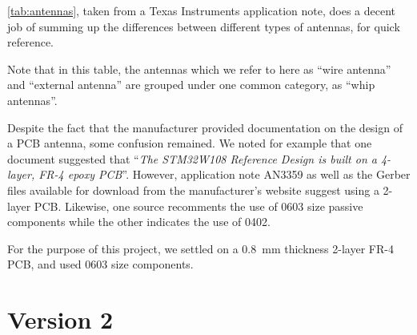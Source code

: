 \autoref{tab:antennas}, taken from a Texas Instruments application
note\citep{slyt296}, does a decent job of summing up the differences between
different types of antennas, for quick reference.

Note that in this table, the antennas which we refer to here as ``wire antenna''
and ``external antenna'' are grouped under one common category, as ``whip
antennas''.

\begin{table}[tbh]
    \myfloatalign
  \caption[Antenna Comparison]{Antenna Comparison}
  \label{tab:antennas}
\end{table}

Despite the fact that the manufacturer provided documentation on the design of
a PCB antenna, some confusion remained. We noted for example that one document
suggested that ``\emph{The STM32W108 Reference Design is built on a 4-layer,
FR-4 epoxy PCB}''\citep{AN3206}. However, application note AN3359\citep{AN3359}
as well as the Gerber files available for download from the manufacturer's
website suggest using a 2-layer PCB. Likewise, one source recomments the use of
0603 size passive components while the other indicates the use of 0402. 

For the purpose of this project, we settled on a \SI{0.8}{mm} thickness 2-layer
FR-4 PCB, and used 0603 size components. 


\section{Version 2}\label{sec:v2}

